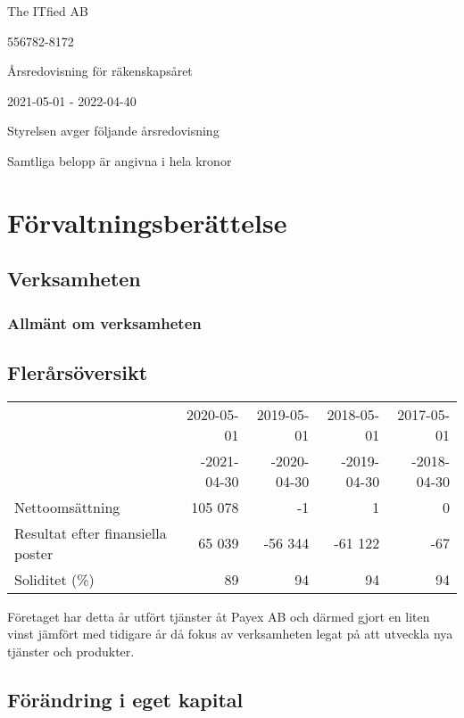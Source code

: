 \documentclass{article}
\begin{document}
\begin{center}
The ITfied AB
\par \vspace*{12pt} 556782-8172
\par \vspace{12pt} Årsredovisning för räkenskapsåret
\par \vspace{12pt} 2021-05-01 - 2022-04-40
\par \vspace{12pt} Styrelsen avger följande årsredovisning
\par \vspace{12pt} Samtliga belopp är angivna i hela kronor
\end{center}

\pagebreak
\section*{Förvaltningsberättelse}

\subsection*{Verksamheten}
\subsubsection*{Allmänt om verksamheten}
\subsection*{Flerårsöversikt}
\begin{tabular}{lrrrr}
  & 2020-05-01 & 2019-05-01 & 2018-05-01 & 2017-05-01 \\
  & -2021-04-30 & -2020-04-30 & -2019-04-30 & -2018-04-30 \\
Nettoomsättning & 105 078 & -1 & 1 & 0 \\
Resultat efter finansiella poster & 65 039 & -56 344 & -61 122 & -67  \\
Soliditet (\%) & 89 & 94 & 94 & 94  \\
\end{tabular}
Företaget har detta år utfört tjänster åt Payex AB och därmed gjort en liten vinst jämfört med tidigare år då fokus av verksamheten legat på att utveckla nya tjänster och produkter.
\subsection*{Förändring i eget kapital}
\end{document}
